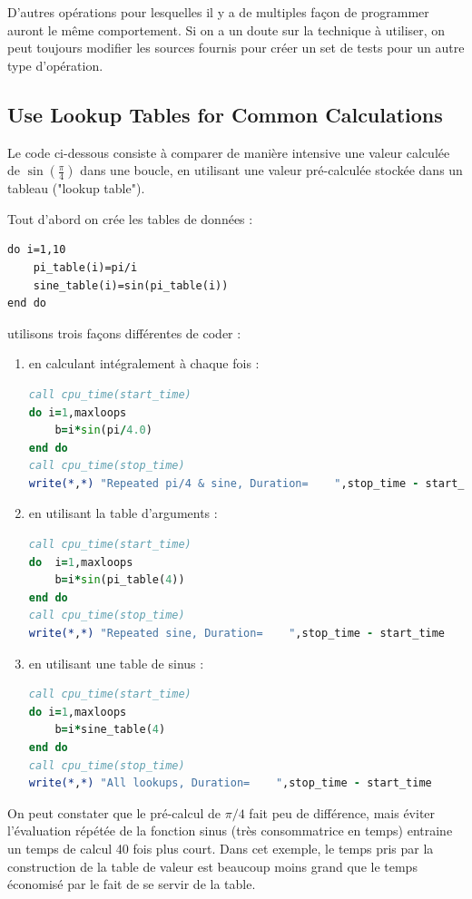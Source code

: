 \documentclass[a4paper,twoside]{article}
\begin{document}
\begin{remarque}
D'autres opérations pour lesquelles il y a de multiples façon de programmer auront le même comportement. Si on a un doute sur la technique à utiliser, on peut toujours modifier les sources fournis pour créer un set de tests pour un autre type d'opération.
\end{remarque}


\subsection{Use Lookup Tables for Common Calculations}
Le code ci-dessous consiste à comparer de manière intensive une valeur calculée de $\sin\left(\frac{\pi}{4}\right)$ dans une boucle, en utilisant une valeur pré-calculée stockée dans un tableau ("lookup table").

Tout d'abord on crée les tables de données : 
\begin{verbatim}
do i=1,10
    pi_table(i)=pi/i
    sine_table(i)=sin(pi_table(i))
end do
\end{verbatim}

utilisons trois façons différentes de coder :
\begin{enumerate}
\item en calculant intégralement à chaque fois :
\begin{lstlisting}[language=Fortran]
call cpu_time(start_time)
do i=1,maxloops
    b=i*sin(pi/4.0)
end do
call cpu_time(stop_time)
write(*,*) "Repeated pi/4 & sine, Duration=    ",stop_time - start_time
\end{lstlisting}

\item en utilisant la table d'arguments :
\begin{lstlisting}[language=Fortran]
call cpu_time(start_time)
do  i=1,maxloops
    b=i*sin(pi_table(4))
end do
call cpu_time(stop_time)
write(*,*) "Repeated sine, Duration=    ",stop_time - start_time
\end{lstlisting}

\item en utilisant une table de sinus :
\begin{lstlisting}[language=Fortran]
call cpu_time(start_time)
do i=1,maxloops
    b=i*sine_table(4)
end do
call cpu_time(stop_time)
write(*,*) "All lookups, Duration=    ",stop_time - start_time
\end{lstlisting}
\end{enumerate}

On peut constater que le pré-calcul de $\pi/4$ fait peu de différence, mais éviter l'évaluation répétée de la fonction sinus (très consommatrice en temps) entraine un temps de calcul 40 fois plus court. Dans cet exemple, le temps pris par la construction de la table de valeur est beaucoup moins grand que le temps économisé par le fait de se servir de la table.
\end{document}
